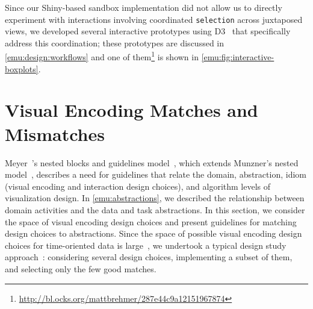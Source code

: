 Since our Shiny-based sandbox implementation did not allow us to directly experiment with interactions involving coordinated {\tt selection} across juxtaposed views, we developed several interactive prototypes using D3~\cite{Bostock2011} that specifically address this coordination;  these prototypes are discussed in \autoref{emu:design:workflows} and one of them\footnote{\url{http://bl.ocks.org/mattbrehmer/287e44c9a12151967874}} is shown in \autoref{emu:fig:interactive-boxplots}.


\section{Visual Encoding Matches and Mismatches}
\label{emu:design:visenc}


Meyer~\etal's nested blocks and guidelines model~\cite{Meyer2015}, which extends Munzner's nested model~\cite{Munzner2009,Munzner2014}, describes a need for guidelines that relate the domain, abstraction, idiom (visual encoding and interaction design choices), and algorithm levels of visualization design.
In \autoref{emu:abstractions}, we described the relationship between domain activities and the data and task abstractions.
In this section, we consider the space of visual encoding design choices and present guidelines for matching design choices to abstractions. 
Since the space of possible visual encoding design choices for time-oriented data is large~\cite{Aigner2011}, we undertook a typical design study approach~\cite{Sedlmair2012}: considering several design choices, implementing a subset of them, and selecting only the few good matches.

